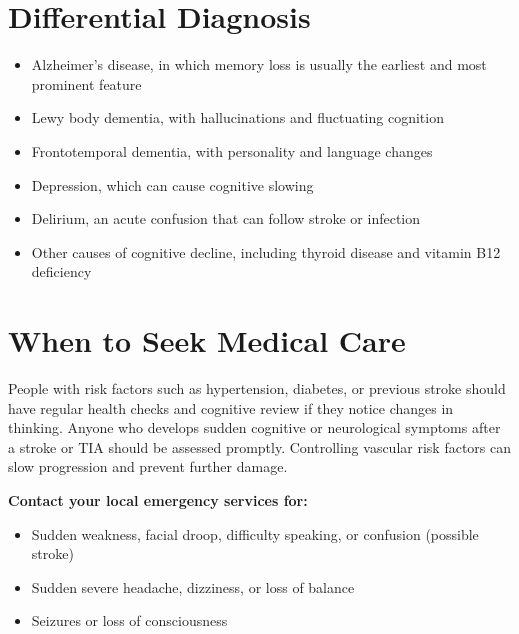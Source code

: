 \section*{Differential Diagnosis}
\begin{itemize}
    \item Alzheimer's disease, in which memory loss is usually the earliest and most prominent feature
    \item Lewy body dementia, with hallucinations and fluctuating cognition
    \item Frontotemporal dementia, with personality and language changes
    \item Depression, which can cause cognitive slowing
    \item Delirium, an acute confusion that can follow stroke or infection
    \item Other causes of cognitive decline, including thyroid disease and vitamin B12 deficiency
\end{itemize}

\section*{When to Seek Medical Care}
People with risk factors such as hypertension, diabetes, or previous stroke should have regular health checks and cognitive review if they notice changes in thinking. Anyone who develops sudden cognitive or neurological symptoms after a stroke or TIA should be assessed promptly. Controlling vascular risk factors can slow progression and prevent further damage.

\textbf{Contact your local emergency services for:}
\begin{itemize}
    \item Sudden weakness, facial droop, difficulty speaking, or confusion (possible stroke)
    \item Sudden severe headache, dizziness, or loss of balance
    \item Seizures or loss of consciousness
\end{itemize}

